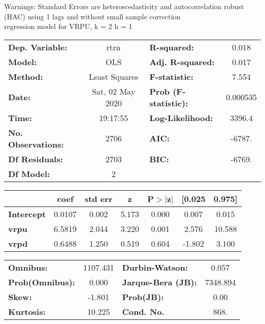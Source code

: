 Warnings: \newline
 [1] Standard Errors are heteroscedasticity and autocorrelation robust (HAC) using 1 lags and without small sample correction\\ 

regression model for VRPU, k = 2 h = 1\begin{center}
\begin{tabular}{lclc}
\toprule
\textbf{Dep. Variable:}    &       rtrn       & \textbf{  R-squared:         } &     0.018   \\
\textbf{Model:}            &       OLS        & \textbf{  Adj. R-squared:    } &     0.017   \\
\textbf{Method:}           &  Least Squares   & \textbf{  F-statistic:       } &     7.554   \\
\textbf{Date:}             & Sat, 02 May 2020 & \textbf{  Prob (F-statistic):} &  0.000535   \\
\textbf{Time:}             &     19:17:55     & \textbf{  Log-Likelihood:    } &    3396.4   \\
\textbf{No. Observations:} &        2706      & \textbf{  AIC:               } &    -6787.   \\
\textbf{Df Residuals:}     &        2703      & \textbf{  BIC:               } &    -6769.   \\
\textbf{Df Model:}         &           2      & \textbf{                     } &             \\
\bottomrule
\end{tabular}
\begin{tabular}{lcccccc}
                   & \textbf{coef} & \textbf{std err} & \textbf{z} & \textbf{P$> |$z$|$} & \textbf{[0.025} & \textbf{0.975]}  \\
\midrule
\textbf{Intercept} &       0.0107  &        0.002     &     5.173  &         0.000        &        0.007    &        0.015     \\
\textbf{vrpu}      &       6.5819  &        2.044     &     3.220  &         0.001        &        2.576    &       10.588     \\
\textbf{vrpd}      &       0.6488  &        1.250     &     0.519  &         0.604        &       -1.802    &        3.100     \\
\bottomrule
\end{tabular}
\begin{tabular}{lclc}
\textbf{Omnibus:}       & 1107.431 & \textbf{  Durbin-Watson:     } &    0.057  \\
\textbf{Prob(Omnibus):} &   0.000  & \textbf{  Jarque-Bera (JB):  } & 7348.894  \\
\textbf{Skew:}          &  -1.801  & \textbf{  Prob(JB):          } &     0.00  \\
\textbf{Kurtosis:}      &  10.225  & \textbf{  Cond. No.          } &     868.  \\
\bottomrule
\end{tabular}
\end{center}

